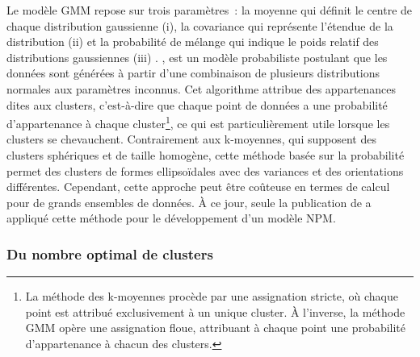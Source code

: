\begin{refsegment}
\begin{customitemize}
{        Le modèle \acrshort{GMM} repose sur trois paramètres~: la moyenne qui définit le centre de chaque distribution gaussienne (i), la covariance qui représente l'étendue de la distribution (ii) et la probabilité de mélange qui indique le poids relatif des distributions gaussiennes (iii) \textcolor{blue}{\autocite[5]{barve_reef-insight_2023}}.
    }, est un modèle probabiliste postulant que les données sont générées à partir d'une combinaison de plusieurs distributions normales aux paramètres inconnus. Cet algorithme attribue des appartenances dites  aux clusters, c'est-à-dire que chaque point de données a une probabilité d'appartenance à chaque cluster\footnote{
        La méthode des k-moyennes procède par une assignation stricte, où chaque point est attribué exclusivement à un unique cluster. À l'inverse, la méthode \acrshort{GMM} opère une assignation floue, attribuant à chaque point une probabilité d'appartenance à chacun des clusters.
    }, ce qui est particulièrement utile lorsque les clusters se chevauchent. Contrairement aux k-moyennes, qui supposent des clusters sphériques et de taille homogène, cette méthode basée sur la probabilité permet des clusters de formes ellipsoïdales avec des variances et des orientations différentes. Cependant, cette approche peut être coûteuse en termes de calcul pour de grands ensembles de données. À ce jour, seule la publication de \textcolor{blue}{\textcite[5]{caset_integrating_2020}} a appliqué cette méthode pour le développement d'un modèle \acrshort{NPM}.
\end{customitemize}%

\subsubsection*{Du nombre optimal de clusters
    \label{chap6:methodologie-statistiques-nombre-clusters}
    }


\end{refsegment}

